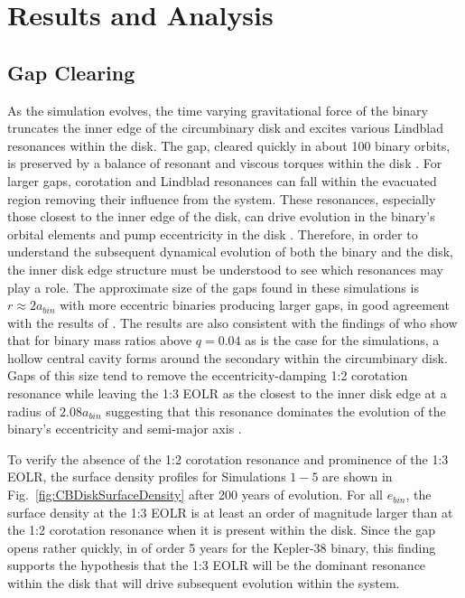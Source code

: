 \section{Results and Analysis}


\subsection{Gap Clearing} \label{CBDisk:sec:GapClearing}

As the simulation evolves, the time varying gravitational force of the
binary truncates the inner edge of the circumbinary disk and excites
various Lindblad resonances within the disk.  The gap, cleared quickly
in about 100 binary orbits, is preserved by a balance of resonant and
viscous torques within the disk \citep{Artymowicz1994}.  For larger gaps,
corotation and Lindblad resonances can fall within the evacuated
region removing their influence from the system.  These resonances,
especially those closest to the inner edge of the disk, can drive
evolution in the binary's orbital elements \citep{Goldreich1980,Artymowicz1991} and
pump eccentricity in the disk \citep{Papaloizou2001}.  Therefore, in
order to understand the subsequent dynamical evolution of both the
binary and the disk, the inner disk edge structure must be understood to see which
resonances may play a role.  The approximate size of the gaps found in
these simulations is $r \approx 2 a_{bin}$ with more eccentric binaries
producing larger gaps, in good agreement with the results of
\citet{Artymowicz1994}.  The results are also consistent with the findings of \citet{DOrazio2016} who show that for binary mass ratios above $q = 0.04$ as is the case 
for the simulations, a hollow central cavity forms around the secondary within the circumbinary disk.  Gaps of this size tend to remove the eccentricity-damping 
1:2 corotation resonance while leaving the 1:3 EOLR as the closest to the inner disk edge at a radius of $2.08 a_{bin}$ suggesting that this resonance 
dominates the evolution of the binary's eccentricity and semi-major axis \citep{Artymowicz1991,Artymowicz1992,Papaloizou2001}.

To verify the absence of the 1:2 corotation resonance and prominence
of the 1:3 EOLR, the surface density profiles for Simulations $1-5$
are shown in Fig.~\ref{fig:CBDiskSurfaceDensity} after 200 years of evolution.
For all $e_{bin}$, the surface density at the 1:3 EOLR is at least an
order of magnitude larger than at the 1:2 corotation resonance when it
is present within the disk.  Since the gap opens rather quickly, in of order 5 years for the Kepler-38 binary,  this finding supports the hypothesis that the 1:3 EOLR will be the dominant resonance within the disk that will drive subsequent evolution within the system.

